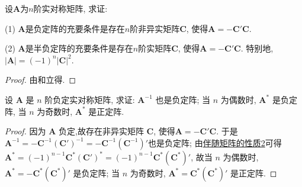 \documentclass[../../main.tex]{subfiles}
\begin{document}
\begin{proposition}
设$\boldsymbol{A}$为$n$阶实对称矩阵, 求证:

(1) $\boldsymbol{A}$是负定阵的充要条件是存在$n$阶非异实矩阵$\boldsymbol{C}$, 使得$\boldsymbol{A}=-\boldsymbol{C}'\boldsymbol{C}$.

(2) $\boldsymbol{A}$是半负定阵的充要条件是存在$n$阶实矩阵$\boldsymbol{C}$, 使得$\boldsymbol{A}=-\boldsymbol{C}'\boldsymbol{C}$. 特别地, $|\boldsymbol{A}| = (-1)^n|\boldsymbol{C}|^2$.
\end{proposition}
\begin{proof}
由和立得.

\end{proof}

\begin{proposition}\label{proposition:负定阵的相关性质}
设 \(\boldsymbol{A}\) 是 \(n\) 阶负定实对称矩阵, 求证: \(\boldsymbol{A}^{-1}\) 也是负定阵; 当 \(n\) 为偶数时, \(\boldsymbol{A}^*\) 是负定阵, 当 \(n\) 为奇数时, \(\boldsymbol{A}^*\) 是正定阵.
\end{proposition}
\begin{proof}
因为 \(\boldsymbol{A}\) 负定,故存在非异实矩阵 \(\boldsymbol{C}\), 使得\(\boldsymbol{A}=-\boldsymbol{C}'\boldsymbol{C}\). 于是 \(\boldsymbol{A}^{-1}=-\boldsymbol{C}^{-1}(\boldsymbol{C}')^{-1}=-\boldsymbol{C}^{-1}(\boldsymbol{C}^{-1})'\)也是负定阵; 由\hyperref[proposition:伴随矩阵的性质]{伴随矩阵的性质2}可得 \(\boldsymbol{A}^*=(-1)^{n - 1}\boldsymbol{C}^*(\boldsymbol{C}')^*=(-1)^{n - 1}\boldsymbol{C}^*(\boldsymbol{C}^*)'\), 故当 \(n\) 为偶数时, \(\boldsymbol{A}^*=-\boldsymbol{C}^*(\boldsymbol{C}^*)'\) 是负定阵; 当 \(n\) 为奇数时, \(\boldsymbol{A}^*=\boldsymbol{C}^*(\boldsymbol{C}^*)'\) 是正定阵.

\end{proof}
\end{document}
